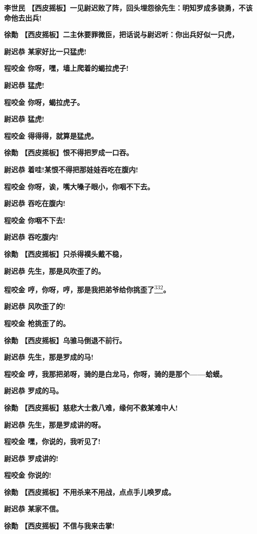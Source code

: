 \textbf{李世民
【西皮摇板】一见尉迟败了阵，回头埋怨徐先生：明知罗成多骁勇，不该命他去出兵!}

\textbf{徐勣
【西皮摇板】二主休要罪微臣，把话说与尉迟听：你出兵好似一只虎，}

\textbf{尉迟恭 某家好比一只猛虎!}

\textbf{程咬金 你呀，嘿，墙上爬着的蝎拉虎子!}

\textbf{尉迟恭 猛虎!}

\textbf{程咬金 你呀，蝎拉虎子。}

\textbf{尉迟恭 猛虎!}

\textbf{程咬金 得得得，就算是猛虎。}

\textbf{徐勣 【西皮摇板】恨不得把罗成一口吞。}

\textbf{尉迟恭 着哇!某恨不得把那娃娃吞吃在腹内!}

\textbf{程咬金 你呀，诶，嘴大嗓子眼小，你咽不下去。}

\textbf{尉迟恭 吞吃在腹内!}

\textbf{程咬金 你咽不下去!}

\textbf{尉迟恭 吞吃腹内!}

\textbf{徐勣 【西皮摇板】只杀得襆头戴不稳，}

\textbf{尉迟恭 先生，那是风吹歪了的。}

\textbf{程咬金
哼，你呀，哼，那是我把弟爷给你挑歪了}\protect\hyperlink{fn332}{\textsuperscript{332}}\textbf{。}

\textbf{尉迟恭 风吹歪了的!}

\textbf{程咬金 枪挑歪了的。}

\textbf{徐勣 【西皮摇板】乌骓马倒退不前行。}

\textbf{尉迟恭 先生，那是罗成的马!}

\textbf{程咬金
哼，我那把弟呀，骑的是白龙马，你呀，骑的是那个------蛤蟆。}

\textbf{尉迟恭 罗成的马。}

\textbf{徐勣 【西皮摇板】慈悲大士救八难，缘何不救某难中人!}

\textbf{尉迟恭 先生，那是罗成讲的呀。}

\textbf{程咬金 嘿，你说的，我听见了!}

\textbf{尉迟恭 罗成讲的!}

\textbf{程咬金 你说的!}

\textbf{徐勣 【西皮摇板】不用杀来不用战，点点手儿唤罗成。}

\textbf{尉迟恭 某家不信。}

\textbf{徐勣 【西皮摇板】不信与我来击掌!}

